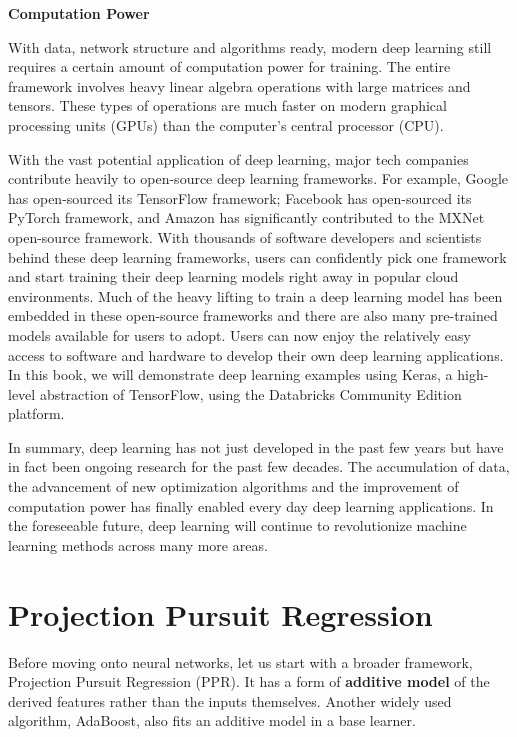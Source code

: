 \documentclass[12pt,]{krantz}
\begin{document}
\textbf{Computation Power}

With data, network structure and algorithms ready, modern deep learning still requires a certain amount of computation power for training. The entire framework involves heavy linear algebra operations with large matrices and tensors. These types of operations are much faster on modern graphical processing units (GPUs) than the computer's central processor (CPU).

With the vast potential application of deep learning, major tech companies contribute heavily to open-source deep learning frameworks. For example, Google has open-sourced its TensorFlow framework; Facebook has open-sourced its PyTorch framework, and Amazon has significantly contributed to the MXNet open-source framework. With thousands of software developers and scientists behind these deep learning frameworks, users can confidently pick one framework and start training their deep learning models right away in popular cloud environments. Much of the heavy lifting to train a deep learning model has been embedded in these open-source frameworks and there are also many pre-trained models available for users to adopt. Users can now enjoy the relatively easy access to software and hardware to develop their own deep learning applications. In this book, we will demonstrate deep learning examples using Keras, a high-level abstraction of TensorFlow, using the Databricks Community Edition platform.

In summary, deep learning has not just developed in the past few years but have in fact been ongoing research for the past few decades. The accumulation of data, the advancement of new optimization algorithms and the improvement of computation power has finally enabled every day deep learning applications. In the foreseeable future, deep learning will continue to revolutionize machine learning methods across many more areas.

\hypertarget{projection-pursuit-regression}{%
\section{Projection Pursuit Regression}\label{projection-pursuit-regression}}

Before moving onto neural networks, let us start with a broader framework, Projection Pursuit Regression (PPR). It has a form of \textbf{additive model} of the derived features rather than the inputs themselves. Another widely used algorithm, AdaBoost, also fits an additive model in a base learner.
\end{document}
